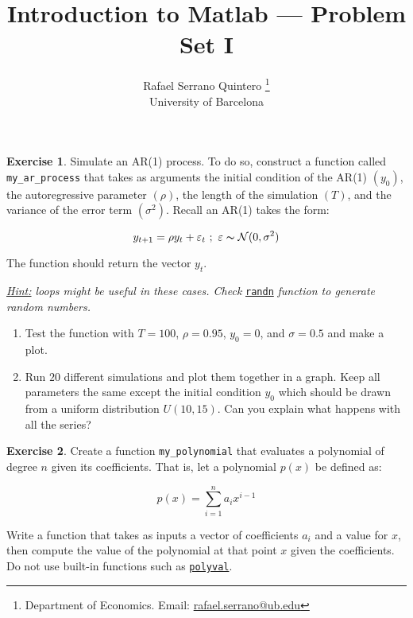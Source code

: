 \documentclass[a4paper,11pt]{article}
\title{\textbf{Introduction to Matlab --- Problem Set I}}
\author{Rafael Serrano Quintero
\thanks{Department of Economics. Email: \href{mailto:rafael.serrano@ub.edu}{rafael.serrano@ub.edu}} \\
University of Barcelona \\}
\date{}
\theoremstyle{definition}
\newtheorem{exercise}{Exercise}
\begin{document}
\VerbatimFootnotes

\maketitle

\begin{exercise}
Simulate an AR(1) process. To do so, construct a function called \verb;my_ar_process; that takes as arguments the initial condition of the AR(1) $(y_0)$, the autoregressive parameter $(\rho)$, the length of the simulation $(T)$, and the variance of the error term $(\sigma^2)$. Recall an AR(1) takes the form:
    
\[
y_{t+1} = \rho y_t + \varepsilon_{t} \ ; \ \varepsilon\thicksim \mathcal{N}(0, \sigma^2)
\]

The function should return the vector $y_t$.

\textit{\underline{Hint:} loops might be useful in these cases. Check} \href{https://www.mathworks.com/help/matlab/ref/randn.html}{\texttt{randn}} \textit{function to generate random numbers.}

\begin{enumerate}
    \item Test the function with $T = 100$, $\rho = 0.95$, $y_0 = 0$, and $\sigma = 0.5$ and make a plot.
    \item Run $20$ different simulations and plot them together in a graph. Keep all parameters the same except the initial condition $y_0$ which should be drawn from a uniform distribution $U(10,15)$. Can you explain what happens with all the series?
\end{enumerate}
\end{exercise}

\begin{exercise}
Create a function \verb;my_polynomial; that evaluates a polynomial of degree $n$ given its coefficients. That is, let a polynomial $p(x)$ be defined as:

\[
p(x) = \sum^n_{i=1}a_i x^{i-1}
\]	
	
Write a function that takes as inputs a vector of coefficients $a_i$ and a value for $x$, then compute the value of the polynomial at that point $x$ given the coefficients. Do not use built-in functions such as \href{https://www.mathworks.com/help/matlab/ref/polyval.html}{\texttt{polyval}}.
\end{exercise}
\end{document}
